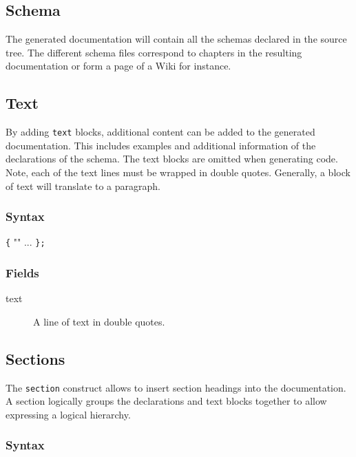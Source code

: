 \documentclass[a4paper,11pt,twoside]{report}
\begin{document}
{{\subsection{Schema}
The generated documentation will contain all the schemas declared in the source 
tree. The different schema files correspond to chapters in the resulting 
documentation or form a page of a Wiki for instance.

\subsection{Text}
\label{sec:doc:text}

By adding \texttt{text} blocks, additional content can be added to the generated
documentation. This includes examples and additional information of the
declarations of the schema. The text blocks are omitted when generating code. 
Note, each of the text lines must be wrapped in double quotes. Generally, a 
block of text will translate to a paragraph.

\subsubsection{Syntax}

\begin{syntax}
 \verb+{+
    ""
    ...
\verb+};+
\end{syntax}

\subsubsection{Fields}

\begin{description}
    \item[text] A line of text in double quotes.
\end{description}

\subsection{Sections}
\label{sec:doc:section}
The \texttt{section} construct allows to insert section headings into the 
documentation. A section logically groups the declarations and text blocks 
together to allow expressing a logical hierarchy. 

\subsubsection{Syntax}

}}
\end{document}
